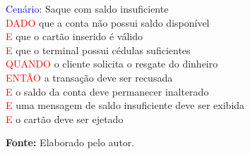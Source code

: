\begin{quadro}[t]
{\begin{minipage}{0.9\textwidth}
            \noindent\normalsize{\textcolor{blue}{Cenário}: Saque com saldo insuficiente}\vspace{3pt}\\
            \hspace*{1.25cm}\textcolor{red}{DADO} que a conta não possui saldo disponível\\
            \hspace*{1.25cm}\textcolor{red}{E} que o cartão inserido é válido\\ 
            \hspace*{1.25cm}\textcolor{red}{E} que o terminal possui cédulas suficientes\\
            \hspace*{1.25cm}\textcolor{red}{QUANDO} o cliente solicita o resgate do dinheiro\\
            \hspace*{1.25cm}\textcolor{red}{ENTÃO} a transação deve ser recusada\\
            \hspace*{1.25cm}\textcolor{red}{E} o saldo da conta deve permanecer inalterado\\
            \hspace*{1.25cm}\textcolor{red}{E} uma mensagem de saldo insuficiente deve ser exibida\\
            \hspace*{1.25cm}\textcolor{red}{E} o cartão deve ser ejetado
        \end{minipage}
    }

    \vspace{5pt}
    \hspace*{0.75cm}\raggedright{\small \textbf{Fonte:} Elaborado pelo autor.}
\end{quadro}